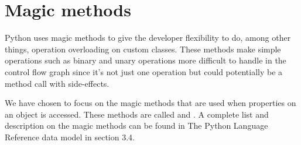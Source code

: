 \section{Magic methods}
Python uses magic methods to give the developer flexibility to do, among other things, operation overloading on custom classes. These methods make simple operations such as binary and unary operations more difficult to handle in the control flow graph since it's not just one operation but could potentially be a method call with side-effects.

We have chosen to focus on the magic methods that are used when properties on an object is accessed. These methods are called  and . A complete list and description on the magic methods can be found in The Python Language Reference data model\cite{pyref.datamodel} in section 3.4.
